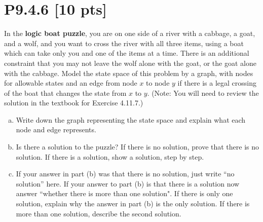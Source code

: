 \documentclass[12pt]{article}
\begin{document}
\section*{\textbf{P9.4.6} [10 pts]}
 In the \textbf{logic boat puzzle}, you are on one side of a river with a cabbage, a goat, and a wolf, and you want to cross the river with all three items, using a boat which can take only you and one of the items at a time. There is an additional constraint that you may not leave the wolf alone with the goat, or the goat alone with the cabbage. Model the state space of this problem by a graph, with nodes for allowable states and an edge from node $x$ to node $y$ if there is a legal crossing of the boat that changes the state from $x$ to $y$. (Note: You will need to review the solution in the textbook for Exercise 4.11.7.)
\begin{enumerate}[(a)]
    \item Write down the graph representing the state space and explain what each node and edge represents.

    \item Is there a solution to the puzzle?  If there is no solution, prove that there is no solution. If there is a solution, show a solution, step by step.

    \item If your answer in part (b) was that there is no solution, just write “no solution” here.  If your answer to part (b) is that there is a solution now answer ``whether there is more than one solution".  If there is only one solution, explain why the answer in part (b) is the only solution.  If there is more than one solution, describe the second solution.
    
\end{enumerate}
\end{document}
